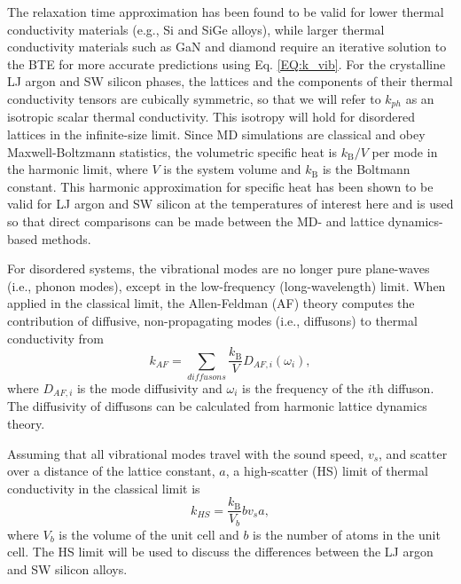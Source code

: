\documentclass[aps,prb,onecolumn,preprint,footinbib,superscriptaddress,amsmath,amssymb,floatfix]{revtex4}
\begin{document}
The relaxation time approximation has been found to be valid  
for lower thermal conductivity materials 
(e.g., Si and SiGe alloys),
\cite{broido_intrinsic_2007,ward_intrinsic_2010,garg_role_2011} 
while larger thermal conductivity 
materials such as GaN and diamond require an  
iterative solution to the BTE for more accurate predictions 
{\color{red}using Eq. \eqref{EQ:k_vib}.} 
\cite{ward_ab_2009,lindsay_thermal_2012} 
For the crystalline LJ argon and SW silicon phases, 
the lattices and the components of their 
thermal conductivity tensors are cubically symmetric, 
so that we will refer to 
$k_{ph}$ as an isotropic scalar thermal conductivity. 
This isotropy will hold for disordered lattices 
in the infinite-size limit. 
Since MD simulations are classical 
and obey Maxwell-Boltzmann 
statistics,\cite{mcquarrie_statistical_2000} the volumetric 
specific heat is $k_{\text{B}}/V$ per mode in the harmonic limit, where $V$ 
is the system volume and $k_{\text{B}}$ is the Boltmann constant. 
This harmonic approximation for specific heat has been shown to be valid 
for LJ argon and SW silicon at the temperatures of interest here
\cite{mcgaughey_quantitative_2004,goicochea_thermal_2010} 
and is used so that direct comparisons can be made between 
the MD- and lattice dynamics-based methods.

For disordered systems, the vibrational modes are no 
longer pure plane-waves (i.e., phonon modes), except in the low-frequency 
(long-wavelength) limit. When applied in the classical limit, 
the Allen-Feldman (AF) theory computes 
the contribution of diffusive, non-propagating modes (i.e., diffusons) 
to thermal conductivity from\cite{allen_thermal_1993} 
\begin{equation}\label{EQ:M:k_AF}
k_{AF} = \sum_{diffusons} \frac{k_{\text{B}}}{V} D_{AF,i}(\omega_i),
\end{equation}
where $D_{AF,i}$ is the mode diffusivity and $\omega_i$ is the 
frequency of the $i$th diffuson. The diffusivity of diffusons 
can be calculated from harmonic lattice dynamics theory.
\cite{allen_thermal_1993,feldman_thermal_1993,feldman_numerical_1999} 

Assuming that all vibrational modes travel with the sound speed, $v_s$, and 
scatter over a distance of the lattice constant, $a$, 
a high-scatter (HS) limit of thermal conductivity in the classical 
limit is\cite{cahill_lattice_1988} 
\begin{equation}\label{EQ:M:k_AF,HS}
k_{HS} = \frac{k_{\text{B}}}{V_b}b v_s a,
\end{equation}
where $V_b$ is the volume of the unit cell and $b$ is the number of atoms 
in the unit cell. The HS limit will be used to 
discuss the differences between the LJ argon and SW silicon alloys. 
\end{document}
